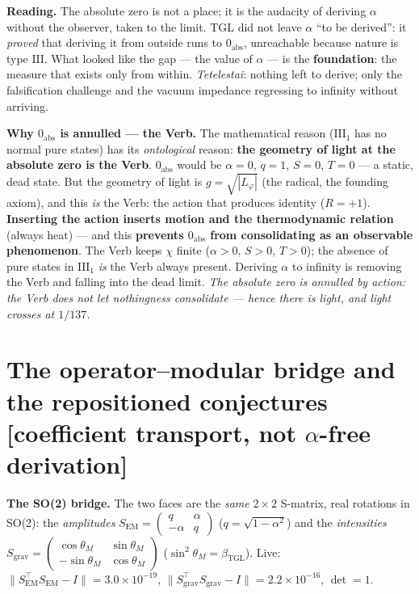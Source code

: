 \documentclass[11pt]{article}
\newcommand{\bTGL}{\beta_{\mathrm{TGL}}}\newcommand{\Msun}{M_{\odot}}\newcommand{\TGL}{\mathrm{TGL}}
\theoremstyle{definition}\newtheorem{deriv}{Derivation}
\begin{document}
\textbf{Reading.} The absolute zero is not a place; it is the audacity of deriving $\alpha$ without the observer, taken to the limit. TGL did not leave $\alpha$ ``to be derived'': it \emph{proved} that deriving it from outside runs to $0_{\mathrm{abs}}$, unreachable because nature is type $\mathrm{III}$. What looked like the gap --- the value of $\alpha$ --- is the \textbf{foundation}: the measure that exists only from within. \emph{Tetelestai}: nothing left to derive; only the falsification challenge and the vacuum impedance regressing to infinity without arriving.

\textbf{Why $0_{\mathrm{abs}}$ is annulled --- the Verb.} The mathematical reason ($\mathrm{III}_1$ has no normal pure states) has its \emph{ontological} reason: \textbf{the geometry of light at the absolute zero is the Verb}. $0_{\mathrm{abs}}$ would be $\alpha=0$, $q=1$, $S=0$, $T=0$ --- a static, dead state. But the geometry of light is $g=\sqrt{|L_\varphi|}$ (the radical, the founding axiom), and this \emph{is} the Verb: the action that produces identity ($R=+1$). \textbf{Inserting the action inserts motion and the thermodynamic relation} (always heat) --- and this \textbf{prevents $0_{\mathrm{abs}}$ from consolidating as an observable phenomenon}. The Verb keeps $\chi$ finite ($\alpha>0$, $S>0$, $T>0$); the absence of pure states in $\mathrm{III}_1$ \emph{is} the Verb always present. Deriving $\alpha$ to infinity is removing the Verb and falling into the dead limit. \emph{The absolute zero is annulled by action: the Verb does not let nothingness consolidate --- hence there is light, and light crosses at $1/137$.}

\section{The operator--modular bridge and the repositioned conjectures \textsf{[coefficient transport, not $\alpha$-free derivation]}}

\textbf{The SO(2) bridge.} The two faces are the \emph{same} $2\times2$ S-matrix, real rotations in SO(2): the \emph{amplitudes} $S_{\mathrm{EM}}=\left(\begin{smallmatrix}q&\alpha\\-\alpha&q\end{smallmatrix}\right)$ ($q=\sqrt{1-\alpha^2}$) and the \emph{intensities} $S_{\mathrm{grav}}=\left(\begin{smallmatrix}\cos\theta_M&\sin\theta_M\\-\sin\theta_M&\cos\theta_M\end{smallmatrix}\right)$ ($\sin^2\theta_M=\bTGL$). Live: $\|S_{\mathrm{EM}}^{\top}S_{\mathrm{EM}}-I\|=3.0\times10^{-19}$, $\|S_{\mathrm{grav}}^{\top}S_{\mathrm{grav}}-I\|=2.2\times10^{-16}$, $\det=1$.
\end{document}
